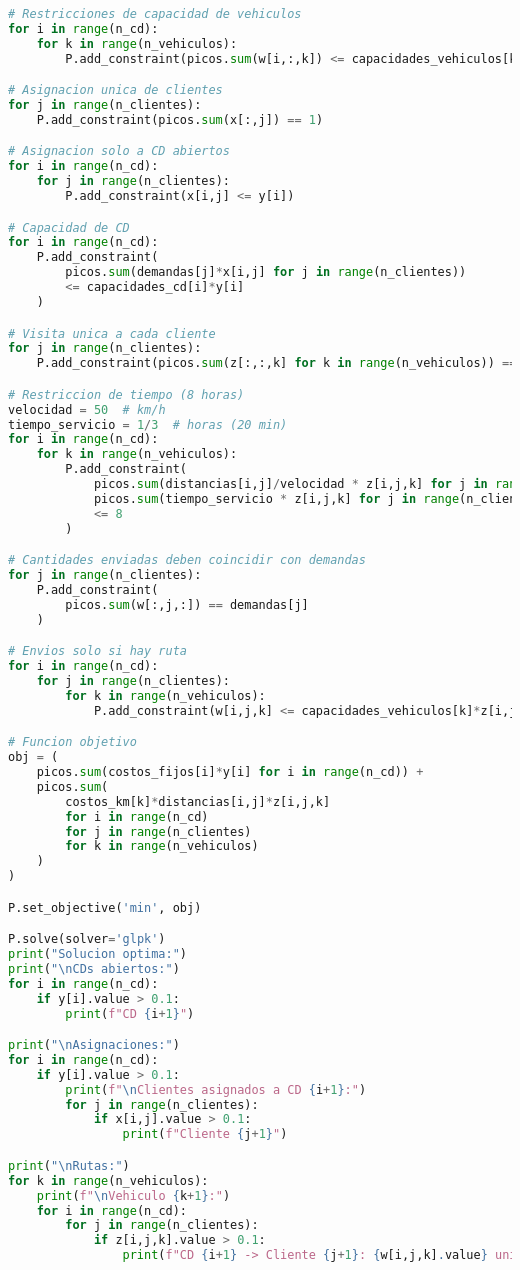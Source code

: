 \documentclass[12pt]{article}
\begin{document}
\begin{enumerate}
\begin{lstlisting}[language=Python]
# Restricciones de capacidad de vehiculos
for i in range(n_cd):
    for k in range(n_vehiculos):
        P.add_constraint(picos.sum(w[i,:,k]) <= capacidades_vehiculos[k])

# Asignacion unica de clientes
for j in range(n_clientes):
    P.add_constraint(picos.sum(x[:,j]) == 1)

# Asignacion solo a CD abiertos
for i in range(n_cd):
    for j in range(n_clientes):
        P.add_constraint(x[i,j] <= y[i])

# Capacidad de CD
for i in range(n_cd):
    P.add_constraint(
        picos.sum(demandas[j]*x[i,j] for j in range(n_clientes)) 
        <= capacidades_cd[i]*y[i]
    )

# Visita unica a cada cliente
for j in range(n_clientes):
    P.add_constraint(picos.sum(z[:,:,k] for k in range(n_vehiculos)) == 1)

# Restriccion de tiempo (8 horas)
velocidad = 50  # km/h
tiempo_servicio = 1/3  # horas (20 min)
for i in range(n_cd):
    for k in range(n_vehiculos):
        P.add_constraint(
            picos.sum(distancias[i,j]/velocidad * z[i,j,k] for j in range(n_clientes)) +
            picos.sum(tiempo_servicio * z[i,j,k] for j in range(n_clientes))
            <= 8
        )

# Cantidades enviadas deben coincidir con demandas
for j in range(n_clientes):
    P.add_constraint(
        picos.sum(w[:,j,:]) == demandas[j]
    )

# Envios solo si hay ruta
for i in range(n_cd):
    for j in range(n_clientes):
        for k in range(n_vehiculos):
            P.add_constraint(w[i,j,k] <= capacidades_vehiculos[k]*z[i,j,k])

# Funcion objetivo
obj = (
    picos.sum(costos_fijos[i]*y[i] for i in range(n_cd)) +
    picos.sum(
        costos_km[k]*distancias[i,j]*z[i,j,k]
        for i in range(n_cd)
        for j in range(n_clientes)
        for k in range(n_vehiculos)
    )
)

P.set_objective('min', obj)

P.solve(solver='glpk')
print("Solucion optima:")
print("\nCDs abiertos:")
for i in range(n_cd):
    if y[i].value > 0.1:
        print(f"CD {i+1}")

print("\nAsignaciones:")
for i in range(n_cd):
    if y[i].value > 0.1:
        print(f"\nClientes asignados a CD {i+1}:")
        for j in range(n_clientes):
            if x[i,j].value > 0.1:
                print(f"Cliente {j+1}")

print("\nRutas:")
for k in range(n_vehiculos):
    print(f"\nVehiculo {k+1}:")
    for i in range(n_cd):
        for j in range(n_clientes):
            if z[i,j,k].value > 0.1:
                print(f"CD {i+1} -> Cliente {j+1}: {w[i,j,k].value} unidades")


\end{lstlisting}
\end{enumerate}
\end{document}
